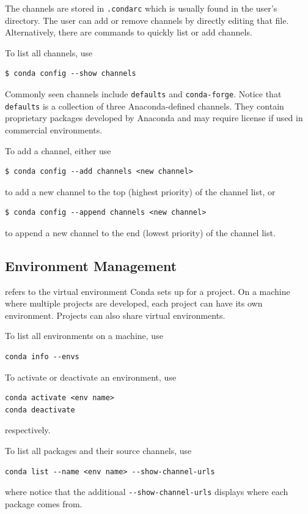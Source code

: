 The channels are stored in \verb|.condarc| which is usually found in the user's directory. The user can add or remove channels by directly editing that file. Alternatively, there are commands to quickly list or add channels. 

To list all channels, use
\begin{lstlisting}
$ conda config --show channels
\end{lstlisting}

Commonly seen channels include \verb|defaults| and \verb|conda-forge|. Notice that \verb|defaults| is a collection of three Anaconda-defined channels. They contain proprietary packages developed by Anaconda and may require license if used in commercial environments.

To add a channel, either use
\begin{lstlisting}
$ conda config --add channels <new channel>
\end{lstlisting}
to add a new channel to the top (highest priority) of the channel list, or
\begin{lstlisting}
$ conda config --append channels <new channel>
\end{lstlisting}
to append a new channel to the end (lowest priority) of the channel list.

\subsection{Environment Management}

 refers to the virtual environment Conda sets up for a project. On a machine where multiple projects are developed, each project can have its own environment. Projects can also share virtual environments.

To list all environments on a machine, use
\begin{lstlisting}
conda info --envs
\end{lstlisting}

To activate or deactivate an environment, use
\begin{lstlisting}
conda activate <env name>
conda deactivate
\end{lstlisting}
respectively.

To list all packages and their source channels, use
\begin{lstlisting}
conda list --name <env name> --show-channel-urls
\end{lstlisting}
where notice that the additional \verb|--show-channel-urls| displays where each package comes from.

